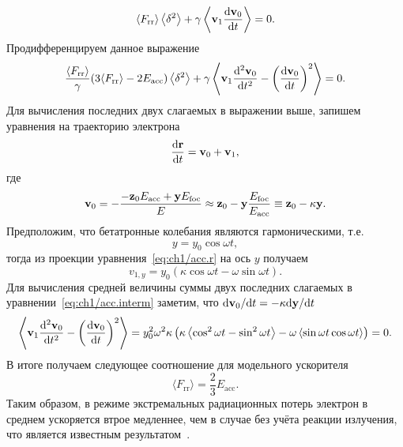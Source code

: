 \begin{align}
    \label{eq:ch1/acc_first_equity}
    \left\langle F_\mathrm{rr} \right\rangle \left\langle \delta^2 \right\rangle + \gamma \left\langle \vb{v}_1 \dv{\vb{v}_0}{t} \right\rangle = 0.
\end{align}
Продифференцируем данное выражение
\begin{equation}
    \label{eq:ch1/acc.interm}
    \frac{\langle F_\mathrm{rr} \rangle }{\gamma} (3 \langle F_\mathrm{rr} \rangle - 2 E_\mathrm{acc}) \left\langle \delta^2  \right\rangle + \gamma\left\langle \vb{v}_1\dv[2]{\vb{v}_0}{t} - \left( \dv{\vb{v}_0}{t} \right)^2 \right\rangle = 0 .
\end{equation}
Для вычисления последних двух слагаемых в выражении выше, запишем уравнения на траекторию электрона
\begin{equation}
    \label{eq:ch1/acc.r}
    \dv{\vb{r}}{t} = \vb{v}_0 + \vb{v}_1, 
\end{equation}
где
\begin{equation}
    \vb{v}_0 = -\frac{-\vb{z}_0 E_\mathrm{acc} + \vb{y} E_\mathrm{foc}}{E} \approx \vb{z}_0 - \vb{y} \frac{E_\mathrm{foc}}{E_\mathrm{acc}} \equiv \vb{z}_0 - \kappa\vb{y}.
\end{equation}
Предположим, что бетатронные колебания являются гармоническими, т.е.
\begin{equation}
    y = y_0\cos\omega t,
\end{equation}
тогда из проекции уравнения~\eqref{eq:ch1/acc.r} на ось $y$ получаем
\begin{equation}
    v_{1,y} = y_0 (\kappa\cos\omega t - \omega\sin\omega t).
\end{equation}
Для вычисления средней величины суммы двух последних слагаемых в уравнении~\eqref{eq:ch1/acc.interm} заметим, что $\dd\vb{v}_0/\dd t = -\kappa \dd\vb{y}/\dd t$
\begin{equation}
    \left\langle \vb{v}_1\dv[2]{\vb{v}_0}{t} - \left( \dv{\vb{v}_0}{t} \right)^2 \right\rangle = y_0^2 \omega^2\kappa \left(\kappa\left\langle  \cos^2\omega t -  \sin^2\omega t \right\rangle - \omega \left\langle\sin\omega t \cos\omega t\right\rangle\right)= 0.
\end{equation}
В итоге получаем следующее соотношение для модельного ускорителя
\begin{equation}
    \label{eq:ch1/acc_23}
    \langle F_\mathrm{rr} \rangle = \frac{2}{3} E_\mathrm{acc} .
\end{equation}
Таким образом, в режиме экстремальных радиационных потерь электрон в среднем ускоряется втрое медленнее, чем в случае без учёта реакции излучения, что является известным результатом~\cite{kostyukov2012radiative, golovanov2021radiation}.
